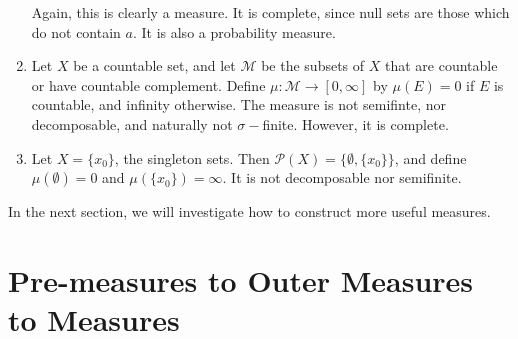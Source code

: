 \documentclass[11pt, a4paper]{memoir}
\theoremstyle{change}
\theoremstyle{plain}
\theoremstyle{nonumberplain}
\numberwithin{equation}{section}
\begin{document}
\begin{enumerate}
\begin{equation*}
        \end{equation*}
        Again, this is clearly a measure.
        It is complete, since null sets are those which do not contain $a$.
        It is also a probability measure.
    \item Let $X$ be a countable set, and let $\mathcal{M}$ be the subsets of $X$ that are countable or have countable complement.
        Define $\mu:\mathcal{M}\to[0,\infty]$ by $\mu(E)=0$ if $E$ is countable, and infinity otherwise.
        The measure is not semifinte, nor decomposable, and naturally not $\sigma-$finite.
        However, it is complete.
    \item Let $X=\{x_0\}$, the singleton sets.
        Then $\mathcal{P}(X)=\{\emptyset,\{x_0\}\}$, and define $\mu(\emptyset)=0$ and $\mu(\{x_0\})=\infty$.
        It is not decomposable nor semifinite.
\end{enumerate}
In the next section, we will investigate how to construct more useful measures.
\section{Pre-measures to Outer Measures to Measures}
\end{document}
